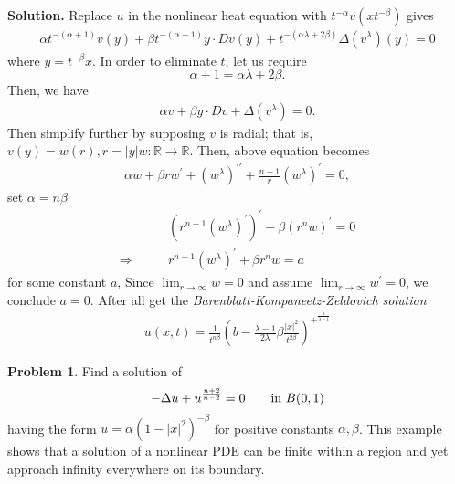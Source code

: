 \documentclass[a4paper]{book}
\newenvironment{solution}%
{\noindent\textbf{Solution.}}%
{\qedhere}
\numberwithin{equation}{chapter}
\theoremstyle{definition}
\newtheorem{pro}[exm]{Problem}
\begin{document}
\begin{solution}
  Replace $u$ in the nonlinear heat equation with $t^{-\alpha}v(xt^{-\beta})$ gives
  \begin{align*}
    \alpha t^{-(\alpha + 1)} v(y) + \beta t^{-(\alpha + 1)} y \cdot Dv(y) + t^{-(\alpha \lambda + 2\beta)}\Delta(v^\lambda)(y) = 0
  \end{align*}
  where $y = t^{-\beta}x$. In order to eliminate $t$, let us require
  \[\alpha + 1 = \alpha\lambda + 2\beta.\]
  Then, we have
  \begin{align*}
    \alpha v + \beta y \cdot Dv + \Delta(v^\lambda) = 0.
  \end{align*}
  Then simplify further by supposing $v$ is radial; that is, $v(y) = w(r), r = \left| y \right| w\colon \mathbb{R} \rightarrow \mathbb{R}$. Then, above equation becomes
  \begin{align*}
    \alpha w + \beta r w^\prime + (w^\lambda)^{\prime\prime} + \frac{n-1}{r}(w^\lambda)^\prime = 0,
  \end{align*}
  set $\alpha = n\beta$
  \begin{align*}
    &(r^{n-1}(w^\lambda)^\prime)^\prime + \beta(r^n w)^\prime = 0 \\
    \Longrightarrow \qquad & r^{n-1}(w^\lambda)^\prime + \beta r^n w = a
  \end{align*}
  for some constant $a$, Since $\lim_{r \rightarrow \infty} w = 0$ and assume $\lim_{r \rightarrow \infty} w^\prime = 0$, we conclude $a = 0$. After all get the \textit{Barenblatt-Kompaneetz-Zeldovich solution}
  \begin{align*}
    u(x,t) = \frac{1}{t^{n\beta}}\left( b - \frac{\lambda - 1}{2\lambda}\beta \frac{\left| x \right|^2}{t^{2\beta}} \right)^{+^\frac{1}{\lambda-1}}
  \end{align*}
\end{solution}



\begin{pro}
  Find a solution of
  \[-\Delta u + u^{\frac{n+2}{n-2}} = 0 \qquad \textmd{in } B(0,1)\]
  having the form $u = \alpha(1 - \left| x \right|^2)^{-\beta}$ for positive constants $\alpha,\beta$. This example shows that a solution of a nonlinear PDE can be finite within a region and yet approach infinity everywhere on its boundary.
\end{pro}
\end{document}
